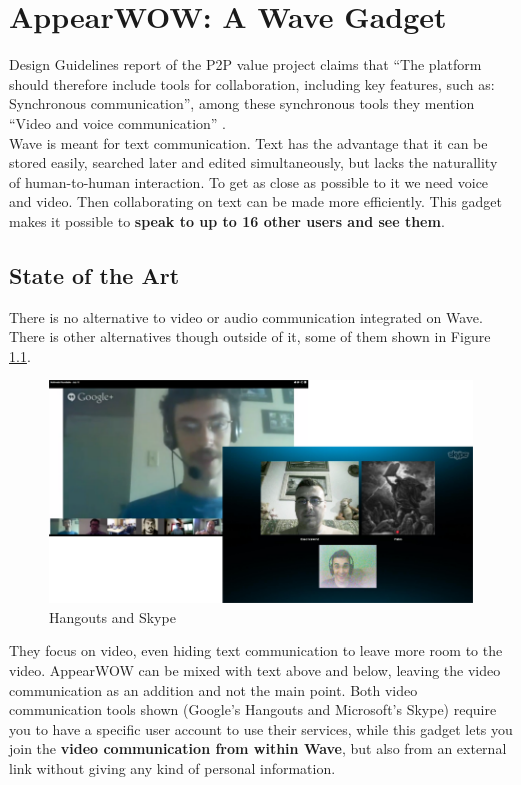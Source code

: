 \thispagestyle{sectioned}
\chapter{AppearWOW: A Wave Gadget}
\label{subsec:video_intro}
Design Guidelines report of the P2P value project claims that ``The platform should therefore include tools for collaboration, including key features, such as: Synchronous communication'', among these synchronous tools they mention ``Video and voice communication'' \cite{ref:p2pvalue}.\\[.2cm]
Wave is meant for text communication. Text has the advantage that it can be stored easily, searched later and edited simultaneously, but lacks the naturallity of human-to-human interaction. To get as close as possible to it we need voice and video. Then collaborating on text can be made more efficiently. This gadget makes it possible to \textbf{speak to up to 16 other users and see them}.
\section{State of the Art}
\label{subsec:video_soa}
There is no alternative to video or audio communication integrated on Wave. There is other alternatives though outside of it, some of them shown in Figure \ref{fig:skype_hangouts}.
\begin{figure}[h]
  \center
    \includegraphics[keepaspectratio, scale=0.43]{Media/Captures/Soa/skype_hangouts.png}
  \caption{Hangouts and Skype}
  \label{fig:skype_hangouts}
\end{figure}
They focus on video, even hiding text communication to leave more room to the video. AppearWOW can be mixed with text above and below, leaving the video communication as an addition and not the main point. Both video communication tools shown (Google's Hangouts and Microsoft's Skype) require you to have a specific user account to use their services, while this gadget lets you join the \textbf{video communication from within Wave}, but also from an external link without giving any kind of personal information.

